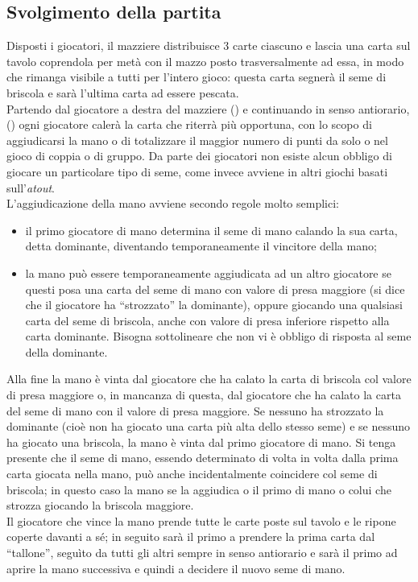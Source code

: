 \subsection{Svolgimento della partita}

Disposti i giocatori, il mazziere distribuisce 3 carte ciascuno e lascia una carta sul tavolo coprendola per metà con il mazzo posto trasversalmente ad essa, in modo che rimanga visibile a tutti per l'intero gioco: questa carta segnerà il seme di briscola e sarà l'ultima carta ad essere pescata.\\
Partendo dal giocatore a destra del mazziere (\cite{giochidicarte}) e continuando in senso antiorario, (\cite{giochidicarte2}) ogni giocatore calerà la carta che riterrà più opportuna, con lo scopo di aggiudicarsi la mano o di totalizzare il maggior numero di punti da solo o nel gioco di coppia o di gruppo. Da parte dei giocatori non esiste alcun obbligo di giocare un particolare tipo di seme, come invece avviene in altri giochi basati sull'\emph{atout}.\\

L'aggiudicazione della mano avviene secondo regole molto semplici:

\begin{itemize}
   \item il primo giocatore di mano determina il seme di mano calando la sua carta, detta dominante, diventando temporaneamente il vincitore della mano;
   \item la mano può essere temporaneamente aggiudicata ad un altro giocatore se questi posa una carta del seme di mano con valore di presa maggiore (si dice che il giocatore ha ``strozzato'' la dominante), oppure giocando una qualsiasi carta del seme di briscola, anche con valore di presa inferiore rispetto alla carta dominante. Bisogna sottolineare che non vi è obbligo di risposta al seme della dominante.
\end{itemize}
Alla fine la mano è vinta dal giocatore che ha calato la carta di briscola col valore di presa maggiore o, in mancanza di questa, dal giocatore che ha calato la carta del seme di mano con il valore di presa maggiore. Se nessuno ha strozzato la dominante (cioè non ha giocato una carta più alta dello stesso seme) e se nessuno ha giocato una briscola, la mano è vinta dal primo giocatore di mano. Si tenga presente che il seme di mano, essendo determinato di volta in volta dalla prima carta giocata nella mano, può anche incidentalmente coincidere col seme di briscola; in questo caso la mano se la aggiudica o il primo di mano o colui che strozza giocando la briscola maggiore.\\
Il giocatore che vince la mano prende tutte le carte poste sul tavolo e le ripone coperte davanti a sé; in seguito sarà il primo a prendere la prima carta dal ``tallone'', seguìto da tutti gli altri sempre in senso antiorario e sarà il primo ad aprire la mano successiva e quindi a decidere il nuovo seme di mano.

